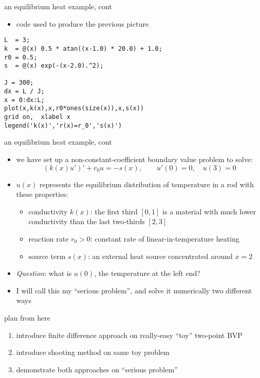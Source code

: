 \documentclass[10pt,hyperref]{beamer}
\begin{document}
\begin{frame}[fragile]{an equilibrium heat example, cont}

\begin{itemize}
\item code used to produce the previous picture
\end{itemize}
\small
\begin{verbatim}
L  = 3;
k  = @(x) 0.5 * atan((x-1.0) * 20.0) + 1.0;
r0 = 0.5;
s  = @(x) exp(-(x-2.0).^2);

J = 300;
dx = L / J;
x = 0:dx:L;
plot(x,k(x),x,r0*ones(size(x)),x,s(x))
grid on,  xlabel x
legend('k(x)','r(x)=r_0','s(x)')
\end{verbatim}
\end{frame}


\begin{frame}{an equilibrium heat example, cont} 

\begin{itemize}
\item we have set up a non-constant-coefficient boundary value problem to solve:
\begin{equation}\label{serious}
\left(k(x) u'\right)' + r_0 u = - s(x), \qquad u'(0)=0, \quad u(3) = 0
\end{equation}
\item $u(x)$ represents the equilibrium distribution of temperature in a rod with these properties:
  \begin{itemize}
  \item conductivity $k(x)$: the first third $[0,1]$ is a material with much lower conductivity than the last two-thirds $[2,3]$
  \item reaction rate $r_0>0$: constant rate of linear-in-temperature heating
  \item source term $s(x)$: an external heat source concentrated around $x=2$
  \end{itemize}
\item \emph{Question}: what is $u(0)$, the temperature at the left end?
\item I will call this my ``serious problem'', and solve it numerically two different ways
\end{itemize}
\end{frame}


\begin{frame}{plan from here} 

\begin{enumerate}
\item introduce finite difference approach on really-easy ``toy'' two-point BVP
\item introduce shooting method on same toy problem
\item demonstrate both approaches on ``serious problem''
\end{enumerate}
\end{frame}
\end{document}
